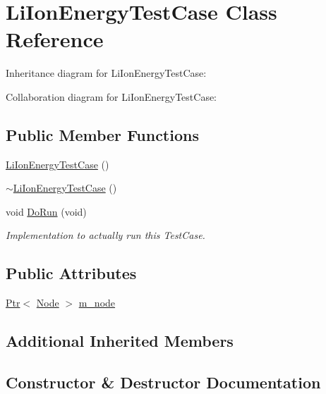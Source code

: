 \hypertarget{classLiIonEnergyTestCase}{}\section{Li\+Ion\+Energy\+Test\+Case Class Reference}
\label{classLiIonEnergyTestCase}


Inheritance diagram for Li\+Ion\+Energy\+Test\+Case\+:


Collaboration diagram for Li\+Ion\+Energy\+Test\+Case\+:
\subsection*{Public Member Functions}
\begin{DoxyCompactItemize}
\item 
\hyperlink{classLiIonEnergyTestCase_a7f3451df3646ab38cf972856b23e2219}{Li\+Ion\+Energy\+Test\+Case} ()
\item 
\hyperlink{classLiIonEnergyTestCase_a27258ca577bef7eb5a9e5b46a156e19a}{$\sim$\+Li\+Ion\+Energy\+Test\+Case} ()
\item 
void \hyperlink{classLiIonEnergyTestCase_aaf5ee6f6a93fc67f4c12796570e3fa7a}{Do\+Run} (void)
\begin{DoxyCompactList}\small\item\em Implementation to actually run this Test\+Case. \end{DoxyCompactList}\end{DoxyCompactItemize}
\subsection*{Public Attributes}
\begin{DoxyCompactItemize}
\item 
\hyperlink{classns3_1_1Ptr}{Ptr}$<$ \hyperlink{classns3_1_1Node}{Node} $>$ \hyperlink{classLiIonEnergyTestCase_a9d2461f197dba973b9b93cb3e82f34ae}{m\+\_\+node}
\end{DoxyCompactItemize}
\subsection*{Additional Inherited Members}


\subsection{Constructor \& Destructor Documentation}
